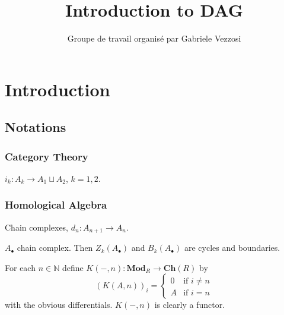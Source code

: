 \documentclass[a4paper]{book}
\title{Introduction to DAG}
\author{Groupe de travail organisé par Gabriele Vezzosi}
\theoremstyle{plain}
\theoremstyle{definition}
\theoremstyle{remark}
\newcommand{\N}{\mathbb{N}}
\newcommand{\ch}{\mathbf{Ch}}
\newcommand{\Mod}{\mathbf{Mod}}
\begin{document}
\frontmatter

\maketitle

\tableofcontents

\chapter*{Introduction}

\listoftodos

\section*{Notations}

\subsection*{Category Theory}

$i_k \colon A_k \to A_1 \sqcup A_2$, $k = 1,2$.

\subsection*{Homological Algebra}

Chain complexes, $d_n \colon A_{n+1} \to A_n$.

$A_\bullet$ chain complex. Then $Z_k(A_\bullet)$ and $B_k(A_\bullet)$ are cycles and boundaries.

For each $n \in \N$ define $K(-,n) \colon \Mod_R \to \ch(R)$ by
\[
(K(A,n))_i = \begin{cases} 0 & \text{if } i \ne n \\ A & \text{if } i = n \end{cases}
\]
with the obvious differentials. $K(-,n)$ is clearly a functor.

\mainmatter



\appendix





\cleardoublepage
{}
{}
\printbibliography
\end{document}
